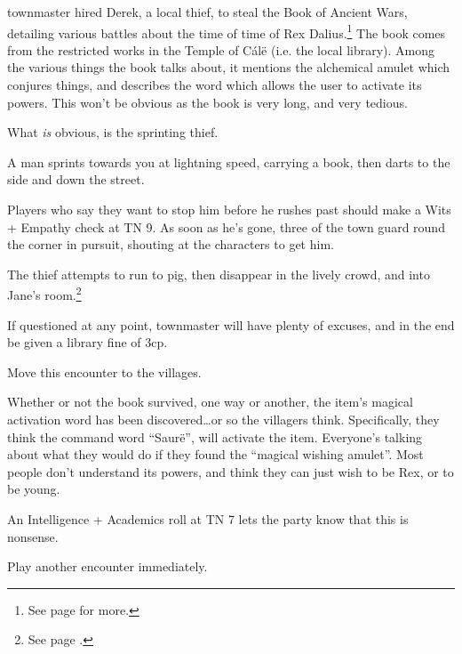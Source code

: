 \begin{multicols}{2}
\Gls{townmaster} hired Derek, a local thief, to steal the Book of Ancient Wars, detailing various battles about the time of time of Rex Dalius.\footnote{See page \pageref{h_dalius} for more.}
The book comes from the restricted works in the Temple of C\'{a}l\"{e} (i.e. the local library).
Among the various things the book talks about, it mentions the alchemical amulet which conjures things, and describes the word which allows the user to activate its powers.
This won't be obvious as the book is very long, and very tedious.

What \emph{is} obvious, is the sprinting thief.

\begin{boxtext}

	A man sprints towards you at lightning speed, carrying a book, then darts to the side and down the street.

\end{boxtext}

Players who say they want to stop him before he rushes past should make a Wits + Empathy check at TN 9.
As soon as he's gone, three of the town guard round the corner in pursuit, shouting at the characters to get him.

The thief attempts to run to \gls{pig}, then disappear in the lively crowd, and into Jane's room.\footnote{See page \pageref{priestessjane}.}

If questioned at any point, \gls{townmaster} will have plenty of excuses, and in the end be given a library fine of 3cp.

Move this encounter to the villages.


Whether or not the book survived, one way or another, the item's magical activation word has been discovered\ldots or so the villagers think.
Specifically, they think the command word ``Saur\"{e}'', will activate the item.
Everyone's talking about what they would do if they found the ``magical wishing amulet''.
Most people don't understand its powers, and think they can just wish to be Rex, or to be young.

An Intelligence + Academics roll at TN 7 lets the party know that this is nonsense.

Play another encounter immediately.



\end{multicols}
